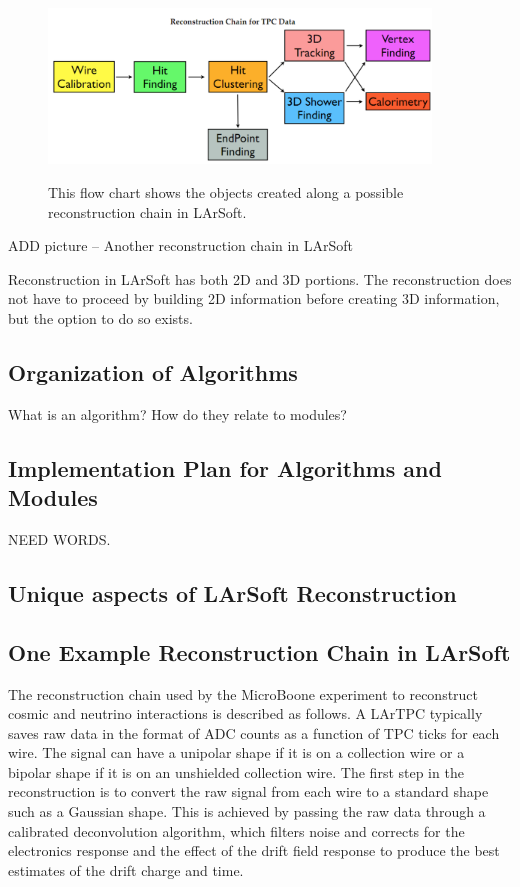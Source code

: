 \documentclass[12pt]{elsarticle}
\begin{document}
\hspace*{2cm}
\begin{figure}[h]
\centering
\caption{This flow chart shows the objects created along a possible reconstruction chain in LArSoft.}
\includegraphics[width=4.0in]{./imgs/LArSoft-Recon-Flow-Soderberg.png}
\label{flow}
\end{figure}

ADD picture -- Another reconstruction chain in LArSoft

Reconstruction in LArSoft has both 2D and 3D portions. The reconstruction does not have to proceed by building 2D information before creating 3D information, but the option to do so exists. 

\subsection{Organization of Algorithms}

What is an algorithm? How do they relate to modules?

\subsection{Implementation Plan for Algorithms and Modules}
NEED WORDS.

\subsection{Unique aspects of LArSoft Reconstruction}

\subsection{One Example Reconstruction Chain in LArSoft}
The reconstruction chain used by the MicroBoone experiment to reconstruct cosmic and neutrino interactions is described as follows. A LArTPC typically saves raw data in the format of ADC counts as a function of TPC ticks for each wire. The signal can have a unipolar shape if it is on a collection wire or a bipolar shape if it is on an unshielded collection wire. The first step in the reconstruction is to convert the raw signal from each wire to a standard shape such as a Gaussian shape. This is achieved by passing the raw data through a calibrated deconvolution algorithm, which filters noise and corrects for the electronics response and the effect of the drift field response to produce the best estimates of the drift charge and time. 
\end{document}
